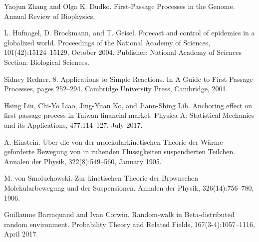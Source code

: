 \documentclass[%
 reprint,
 amsmath,amssymb,
 longbibliography,
 aps,
]{revtex4-1}
\begin{document}
\begin{thebibliography}{30}

 Yaojun Zhang and Olga K. Dudko. First-Passage Processes in the Genome. Annual Review of Biophysics,

  L. Hufnagel, D. Brockmann, and T. Geisel. Forecast and control of epidemics in a globalized world. Proceedings of the National Academy of Sciences, 101(42):15124–15129, October 2004. Publisher: National Academy of Sciences Section: Biological Sciences.

  Sidney Redner. 8. Applications to Simple Reactions. In A Guide to First-Passage Processes, pages 252–294. Cambridge University Press, Cambridge, 2001.

  Hsing Liu, Chi-Yo Liao, Jing-Yuan Ko, and Jiann-Shing Lih. Anchoring effect on first passage process in Taiwan financial market. Physica A: Statistical Mechanics and its Applications, 477:114–127, July 2017.

  A. Einstein. Über die von der molekularkinetischen Theorie der Wärme geforderte Bewegung von in ruhenden Flüssigkeiten suspendierten Teilchen. Annalen der Physik, 322(8):549–560, January 1905.

  M. von Smoluchowski. Zur kinetischen Theorie der Brownschen Molekularbewegung und der Suspensionen. Annalen der Physik, 326(14):756–780, 1906.

  Guillaume Barraquand and Ivan Corwin. Random-walk in Beta-distributed random environment. Probability Theory and Related Fields, 167(3-4):1057–1116, April 2017.

\end{thebibliography}
\end{document}

